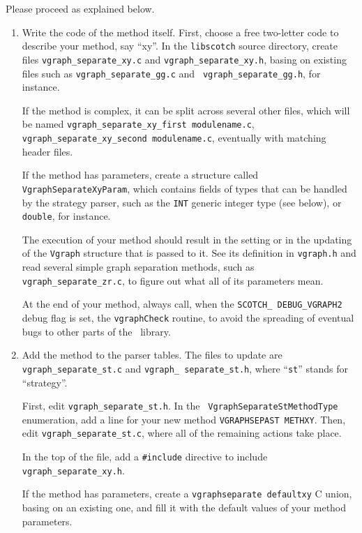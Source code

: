 Please proceed as explained below.
\begin{enumerate}
\item
Write the code of the method itself. First, choose a free two-letter
code to describe your method, say ``xy''. In the {\tt libscotch}
source directory, create files {\tt vgraph\_\lbt separate\_\lbt xy.c}
and {\tt vgraph\_\lbt separate\_\lbt xy.h}, basing on existing
files such as {\tt vgraph\_\lbt separate\_\lbt gg.c} and {\tt
vgraph\_\lbt separate\_\lbt gg.h}, for instance.

If the method is complex, it can be split across several other files,
which will be named {\tt vgraph\_\lbt separate\_\lbt xy\_\lbt first\lbt
module\lbt name.c}, {\tt vgraph\_\lbt separate\_\lbt xy\_\lbt second\lbt
module\lbt name.c}, eventually with matching header files.

If the method has parameters, create a structure called {\tt
Vgraph\lbt Separate\lbt Xy\lbt Param}, which contains fields of
types that can be handled by the strategy parser, such as the
{\tt INT} generic integer type (see below), or {\tt double}, for
instance.

The execution of your method should result in the setting or in the
updating of the {\tt Vgraph} structure that is passed to it. See its
definition in {\tt vgraph.h} and read several simple graph separation
methods, such as {\tt vgraph\_\lbt separate\_\lbt zr.c}, to figure out
what all of its parameters mean.

At the end of your method, always call, when the {\tt SCOTCH\_\lbt
DEBUG\_\lbt VGRAPH2} debug flag is set, the {\tt vgraph\lbt Check}
routine, to avoid the spreading of eventual bugs to other parts of
the \libscotch\ library.
\item
Add the method to the parser tables. The files to update are
{\tt vgraph\_\lbt separate\_\lbt st.c} and {\tt vgraph\_\lbt
separate\_\lbt st.h}, where ``{\tt st}'' stands for ``strategy''.

First, edit {\tt vgraph\_\lbt separate\_\lbt st.h}. In the {\tt
Vgraph\lbt Separate\lbt St\lbt Method\lbt Type} enumeration,
add a line for your new method {\tt VGRAPH\lbt SEPA\lbt ST\lbt
METH\lbt XY}. Then, edit {\tt vgraph\_\lbt separate\_\lbt st.c},
where all of the remaining actions take place.

In the top of the file, add a {\tt \#include} directive to include
{\tt vgraph\_\lbt separate\_\lbt xy.h}.

If the method has parameters, create a {\tt vgraph\lbt separate\lbt
default\lbt xy} C union, basing on an existing one, and fill it with
the default values of your method parameters.


\end{enumerate}
